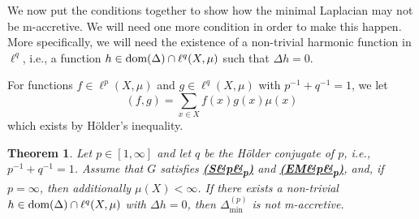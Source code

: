 \documentclass[letterpaper]{article}
\newtheorem{theorem}[lemma]{Theorem}
\theoremstyle{definition}
\theoremstyle{named}
\numberwithin{equation}{section}
\newcommand{\EM}[1][]{\hyperlink{ass:EM}{\textup{\textbf{(EM\ifx&#1&\else\textsubscript{#1}\fi)}}}}
\newcommand{\SP}[1][]{\hyperlink{ass:SP}{\textup{\textbf{(S\ifx&#1&\else\textsubscript{#1}\fi)}}}}
\newcommand{\dom}{\textnormal{dom}} %
\newcommand{\deltam}{\Delta_{\min}}
\begin{document}
We now put the conditions together to show how the minimal Laplacian may not be m-accretive.
We will need one more condition in order to make this happen. More specifically,
we will need the existence of a non-trivial harmonic function in $\ell^q$, i.e., a function
$h \in \dom(\Delta) \cap \ell^q(X,\mu)$ such that $\Delta h=0$.

For functions $f \in \ell^p(X,\mu)$ and $ g\in \ell^q(X,\mu)$ with $p^{-1}+q^{-1}=1$, we let
$$(f, g) = \sum_{x \in X} f(x)g(x)\mu(x)$$
which exists by H{\"o}lder's inequality.




\begin{theorem}\label{t:non_minimal_m-accretivity}
    Let $p \in [1,\infty]$ and let $q$ be the H{\"o}lder conjugate of $p$, i.e., $p^{-1}+q^{-1}=1$. 
    Assume that $G$ satisfies \SP[p] and \EM[p], and, if $p=\infty$, 
    then additionally $\mu(X)<\infty$. 
    If there exists a non-trivial $h \in \dom(\Delta) \cap \ell^q(X,\mu)$ 
    with $\Delta h=0$, then $\deltam^{(p)}$ is not m-accretive.
\end{theorem}
\end{document}
